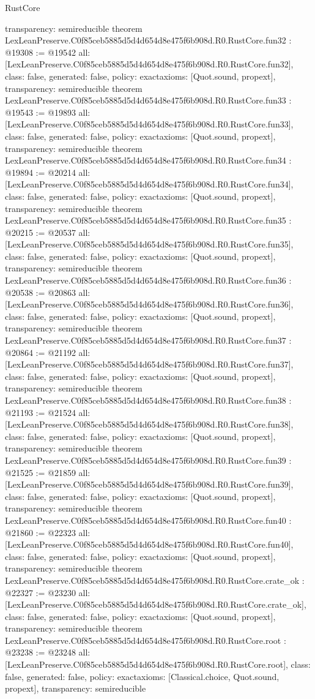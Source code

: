 \begin{lexlean}{RustCore}
\begin{coremodule}
{  transparency: semireducible
}
theorem LexLeanPreserve.C0f85ceb5885d5d4d654d8e475f6b908d.R0.RustCore.fun32 : @19308 := @19542 {
  all: [LexLeanPreserve.C0f85ceb5885d5d4d654d8e475f6b908d.R0.RustCore.fun32],
  class: false,
  generated: false,
  policy: exact{axioms: [Quot.sound, propext]},
  transparency: semireducible
}
theorem LexLeanPreserve.C0f85ceb5885d5d4d654d8e475f6b908d.R0.RustCore.fun33 : @19543 := @19893 {
  all: [LexLeanPreserve.C0f85ceb5885d5d4d654d8e475f6b908d.R0.RustCore.fun33],
  class: false,
  generated: false,
  policy: exact{axioms: [Quot.sound, propext]},
  transparency: semireducible
}
theorem LexLeanPreserve.C0f85ceb5885d5d4d654d8e475f6b908d.R0.RustCore.fun34 : @19894 := @20214 {
  all: [LexLeanPreserve.C0f85ceb5885d5d4d654d8e475f6b908d.R0.RustCore.fun34],
  class: false,
  generated: false,
  policy: exact{axioms: [Quot.sound, propext]},
  transparency: semireducible
}
theorem LexLeanPreserve.C0f85ceb5885d5d4d654d8e475f6b908d.R0.RustCore.fun35 : @20215 := @20537 {
  all: [LexLeanPreserve.C0f85ceb5885d5d4d654d8e475f6b908d.R0.RustCore.fun35],
  class: false,
  generated: false,
  policy: exact{axioms: [Quot.sound, propext]},
  transparency: semireducible
}
theorem LexLeanPreserve.C0f85ceb5885d5d4d654d8e475f6b908d.R0.RustCore.fun36 : @20538 := @20863 {
  all: [LexLeanPreserve.C0f85ceb5885d5d4d654d8e475f6b908d.R0.RustCore.fun36],
  class: false,
  generated: false,
  policy: exact{axioms: [Quot.sound, propext]},
  transparency: semireducible
}
theorem LexLeanPreserve.C0f85ceb5885d5d4d654d8e475f6b908d.R0.RustCore.fun37 : @20864 := @21192 {
  all: [LexLeanPreserve.C0f85ceb5885d5d4d654d8e475f6b908d.R0.RustCore.fun37],
  class: false,
  generated: false,
  policy: exact{axioms: [Quot.sound, propext]},
  transparency: semireducible
}
theorem LexLeanPreserve.C0f85ceb5885d5d4d654d8e475f6b908d.R0.RustCore.fun38 : @21193 := @21524 {
  all: [LexLeanPreserve.C0f85ceb5885d5d4d654d8e475f6b908d.R0.RustCore.fun38],
  class: false,
  generated: false,
  policy: exact{axioms: [Quot.sound, propext]},
  transparency: semireducible
}
theorem LexLeanPreserve.C0f85ceb5885d5d4d654d8e475f6b908d.R0.RustCore.fun39 : @21525 := @21859 {
  all: [LexLeanPreserve.C0f85ceb5885d5d4d654d8e475f6b908d.R0.RustCore.fun39],
  class: false,
  generated: false,
  policy: exact{axioms: [Quot.sound, propext]},
  transparency: semireducible
}
theorem LexLeanPreserve.C0f85ceb5885d5d4d654d8e475f6b908d.R0.RustCore.fun40 : @21860 := @22323 {
  all: [LexLeanPreserve.C0f85ceb5885d5d4d654d8e475f6b908d.R0.RustCore.fun40],
  class: false,
  generated: false,
  policy: exact{axioms: [Quot.sound, propext]},
  transparency: semireducible
}
theorem LexLeanPreserve.C0f85ceb5885d5d4d654d8e475f6b908d.R0.RustCore.crate_ok : @22327 := @23230 {
  all: [LexLeanPreserve.C0f85ceb5885d5d4d654d8e475f6b908d.R0.RustCore.crate_ok],
  class: false,
  generated: false,
  policy: exact{axioms: [Quot.sound, propext]},
  transparency: semireducible
}
theorem LexLeanPreserve.C0f85ceb5885d5d4d654d8e475f6b908d.R0.RustCore.root : @23238 := @23248 {
  all: [LexLeanPreserve.C0f85ceb5885d5d4d654d8e475f6b908d.R0.RustCore.root],
  class: false,
  generated: false,
  policy: exact{axioms: [Classical.choice, Quot.sound, propext]},
  transparency: semireducible
}


\end{coremodule}
\end{lexlean}
